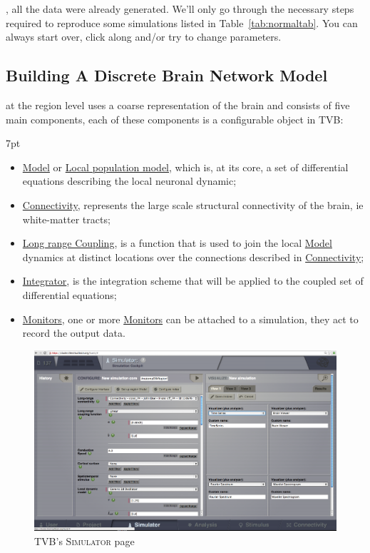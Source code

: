 \documentclass{tufte-handout}
\newenvironment{blah}{%
  \def\FrameCommand{%
    \hspace{1pt}%
    {\color{DarkOrange}\vrule width 2pt}%
    {\color{PeachPuff}\vrule width 4pt}%
    \colorbox{PeachPuff}%
  }%
  \MakeFramed{\advance\hsize-\width\FrameRestore}%
  \noindent\hspace{-4.55pt}%
  \begin{adjustwidth}{}{7pt}%
  \vspace{2pt}\vspace{2pt}%
}
{%
  \vspace{2pt}\end{adjustwidth}\endMakeFramed%
}
\begin{document}
, all the data were already generated. We'll only go through the necessary steps required to reproduce some simulations listed in Table~\ref{tab:normaltab}. You can always start over, click along and/or try to change parameters.


\subsection{Building A Discrete Brain Network Model}\label{sec:region_simulations}

 at the region level uses a coarse representation of the brain and consists of
five main components, each of these components is a configurable object in TVB:

\begin{blah}
\begin{itemize}
\item \underline{Model} or \underline{Local population model}, which is, at its core, a set of differential equations describing the local neuronal dynamic;
\item \underline{Connectivity}, represents the large scale structural connectivity of the brain, ie white-matter tracts;
\item \underline{Long range Coupling}, is a function that is used to join the local \underline{Model} dynamics at distinct locations over the connections described in \underline{Connectivity};
\item \underline{Integrator}, is the integration scheme that will be applied to the coupled set of differential equations;
\item \underline{Monitors}, one or more \underline{Monitors} can be attached to a simulation, they act to record the output data.
\end{itemize}
\end{blah}

\begin{figure}[h]
  \includegraphics[width=\linewidth]{Handout_UI_BuildingYourOwnBrainNetworkModel_SimulatorArea}%
  \caption{TVB's \textsc{Simulator} page}%
  \label{fig:fig}%
\end{figure}
\end{document}
